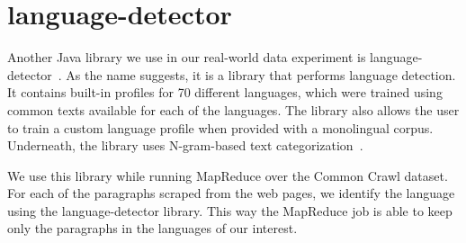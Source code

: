 \section{language-detector}
\label{section:language_detector}

Another Java library we use in our real-world data experiment is language-detector~\cite{language-detector}. As the name suggests, it is a library that performs language detection. It contains built-in profiles for 70 different languages, which were trained using common texts available for each of the languages. The library also allows the user to train a custom language profile when provided with a monolingual corpus. Underneath, the library uses N-gram-based text categorization~\cite{Cavnar94}. 

We use this library while running MapReduce over the Common Crawl dataset. For each of the paragraphs scraped from the web pages, we identify the language using the language-detector library. This way the MapReduce job is able to keep only the paragraphs in the languages of our interest.
